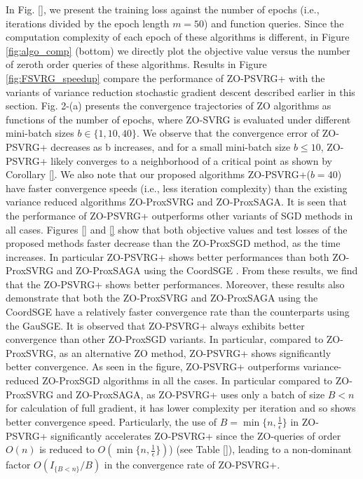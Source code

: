 \documentclass{article}
\theoremstyle{definition}
\theoremstyle{remark}
\begin{document}
{\color{Brown}
In Fig. \ref{}, we present the training loss against the number of epochs (i.e., iterations divided by the
epoch length $m = 50$) and function queries.
}
Since the computation complexity of each epoch of these
algorithms is different, in Figure \ref{fig:algo_comp} (bottom) we directly plot the objective value versus the number of zeroth order queries of these algorithms.
Results in Figure \eqref{fig:FSVRG_speedup} compare the performance of ZO-PSVRG+ with the variants of variance reduction stochastic gradient descent described earlier in this section.  
{\color{Brown}
Fig. 2-(a) presents the
convergence trajectories of ZO algorithms as functions of the number of epochs, where ZO-SVRG is evaluated under different mini-batch sizes $b \in \{1, 10, 40\}$. We observe that the convergence
error of ZO-PSVRG+ decreases as b increases, and for a small mini-batch size $b \leq 10$, ZO-PSVRG+
likely converges to a neighborhood of a critical point as shown by Corollary \ref{}. We also note that
our proposed algorithms ZO-PSVRG+($b = 40$) have faster
convergence speeds (i.e., less iteration complexity) than the existing variance reduced algorithms ZO-ProxSVRG and ZO-ProxSAGA.
}
It is seen that the performance of ZO-PSVRG+ outperforms other variants of SGD methods in all cases.
{\color{Green}
Figures \ref{} and \ref{} show that both objective values and test losses of the proposed methods faster
decrease than the ZO-ProxSGD method, as the time increases.
In particular ZO-PSVRG+ shows better performances than both ZO-ProxSVRG and ZO-ProxSAGA
using the CoordSGE . From these results, we
find that the ZO-PSVRG+ shows better performances. Moreover, these results also demonstrate that both the ZO-ProxSVRG and
ZO-ProxSAGA using the CoordSGE have a relatively faster
convergence rate than the counterparts using the GauSGE.
}
 It is observed that ZO-PSVRG+ always exhibits better convergence than other ZO-ProxSGD variants. In particular, compared to ZO-ProxSVRG, as an alternative ZO method, ZO-PSVRG+ shows significantly better convergence.  
As seen in the figure, ZO-PSVRG+ outperforms variance-reduced ZO-ProxSGD algorithms in all the cases. In particular compared to ZO-ProxSVRG and ZO-ProxSAGA, as ZO-PSVRG+ uses only a batch of size $B < n$ for calculation of full gradient, it has lower complexity per iteration and so shows better convergence speed.  
{\color{Brown}
Particularly, the use of $B = \min\{n, \frac{1}{\epsilon}\}$ in ZO-PSVRG+ significantly
accelerates ZO-PSVRG+ since the ZO-queries of order $O(n)$ is reduced to $O(\min\{n, \frac{1}{\epsilon}\})$) (see Table \ref{}), leading
to a non-dominant factor $O(I_{\{B < n\}}/B)$ in the convergence rate of ZO-PSVRG+.}
\end{document}
